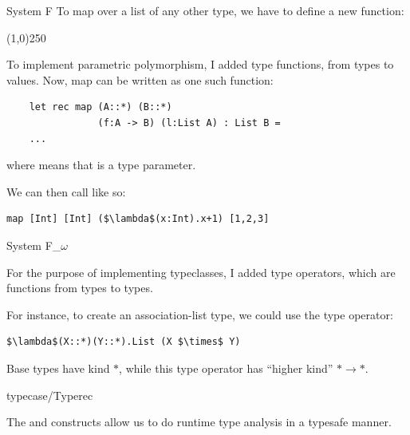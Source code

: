 \documentclass[portrait,final,paperwidth=40in,paperheight=40in]{baposter}
\begin{document}
{\begin{poster}
\begin{posterbox}[name=poly,column=1]{System F}
  To map over a list of any other type, we have to define a new function:

  \begin{center}
    \line(1,0){250}
  \end{center}

  To implement parametric polymorphism, I added type functions, from types
  to values. Now, map can be written as one such function:

  \begin{lstlisting}
    let rec map (A::*) (B::*)
                (f:A -> B) (l:List A) : List B =
    ...
  \end{lstlisting}

  where  means that  is a type parameter.

  We can then call  like so:

  \begin{lstlisting}[mathescape]
    map [Int] [Int] ($\lambda$(x:Int).x+1) [1,2,3]
  \end{lstlisting}

  \end{posterbox}

  \begin{posterbox}[name=tyop,column=1,below=poly]{System F_$\omega$}
    
  For the purpose of implementing typeclasses, I added type operators,
  which are functions from types to types.

  For instance, to create an association-list type,
  we could use the type operator:

  \begin{lstlisting}[mathescape]
    $\lambda$(X::*)(Y::*).List (X $\times$ Y)
  \end{lstlisting}

  Base types have kind $\ast$, while
  this type operator has ``higher kind'' $\ast \rightarrow \ast$.

  \end{posterbox}

  \begin{posterbox}[name=tcase,column=1,below=tyop]{typecase/Typerec}
    
  The  and  constructs allow us to do
  runtime type analysis in a typesafe manner.


\end{posterbox}
\end{poster}}
\end{document}
